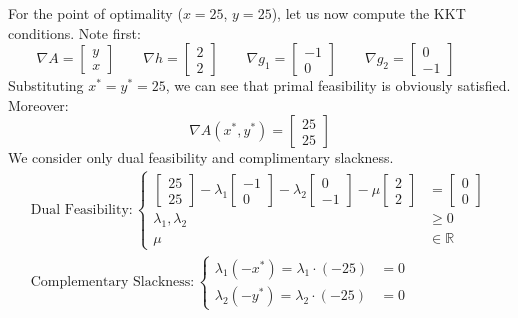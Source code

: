 For the point of optimality ($x=25$, $y=25$), let us now compute the KKT conditions. Note first:
\begin{equation}
\nabla A = \begin{bmatrix}y\\x\end{bmatrix} \quad \quad 
\nabla h = \begin{bmatrix}2\\2\end{bmatrix} \quad \quad 
\nabla g_1 = \begin{bmatrix}-1\\0\end{bmatrix} \quad \quad 
\nabla g_2 = \begin{bmatrix}0\\-1\end{bmatrix} \quad \quad 
\end{equation}
Substituting $x^* = y^* = 25$, we can see that primal feasibility is obviously satisfied. Moreover:
\begin{equation}
\nabla A(x^*,y^*) = \begin{bmatrix}25\\25\end{bmatrix}
\end{equation}
We  consider only dual feasibility and complimentary slackness. 
\begin{gather*}
\text{Dual Feasibility}:\left\{
\begin{aligned}
\begin{bmatrix}25\\25\end{bmatrix} -\lambda_1\begin{bmatrix}-1\\0\end{bmatrix} - 
\lambda_2\begin{bmatrix}0\\-1\end{bmatrix} - \mu\begin{bmatrix}2\\2\end{bmatrix} &= \begin{bmatrix}0\\0\end{bmatrix}\\
\lambda_1,\lambda_2 & \geq 0\\
\mu &\in \mathbb{R}
\end{aligned}
\right.\\
\text{Complementary Slackness}:\left\{
\begin{aligned}
\lambda_1(-x^*) = \lambda_1\cdot(-25) &= 0\\
\lambda_2(-y^*) = \lambda_2\cdot(-25) &= 0
\end{aligned}
\right.
\end{gather*}
